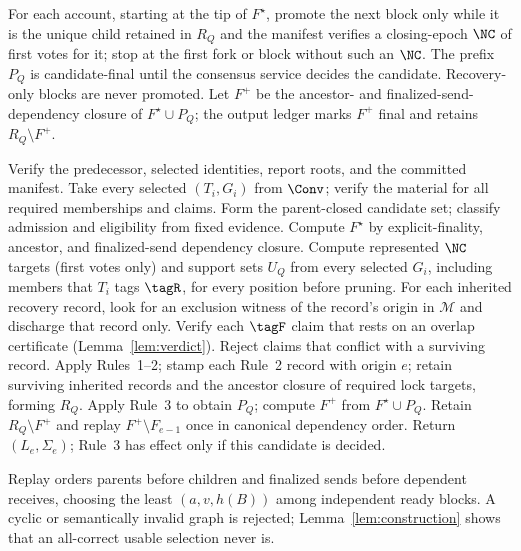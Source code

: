 For each account, starting at the tip of $F^\star$, promote the next block only while it is the unique child retained in $R_Q$ and the manifest verifies a closing-epoch $\NC$ of first votes for it; stop at the first fork or block without such an $\NC$. The prefix $P_Q$ is candidate-final until the consensus service decides the candidate. Recovery-only blocks are never promoted. Let $F^+$ be the ancestor- and finalized-send-dependency closure of $F^\star\cup P_Q$; the output ledger marks $F^+$ final and retains $R_Q\setminus F^+$.

\begin{algorithm}[t]
\caption{$\Build(S_{e-1},Q,\mathcal M)$}
\label{alg:build}
\small
\begin{algorithmic}[1]
\State Verify the predecessor, selected identities, report roots, and the committed manifest.
\State Take every selected $(T_i,G_i)$ from $\Conv$; verify the material for all required memberships and claims.
\State Form the parent-closed candidate set; classify admission and eligibility from fixed evidence.
\State Compute $F^\star$ by explicit-finality, ancestor, and finalized-send dependency closure.
\State Compute represented $\NC$ targets (first votes only) and support sets $U_Q$ from every selected $G_i$, including members that $T_i$ tags $\tagR$, for every position before pruning.
\State For each inherited recovery record, look for an exclusion witness of the record's origin in $\mathcal M$ and discharge that record only. Verify each $\tagF$ claim that rests on an overlap certificate (Lemma~\ref{lem:verdict}). Reject claims that conflict with a surviving record.
\State Apply Rules~1--2; stamp each Rule~2 record with origin $e$; retain surviving inherited records and the ancestor closure of required lock targets, forming $R_Q$.
\State Apply Rule~3 to obtain $P_Q$; compute $F^+$ from $F^\star\cup P_Q$.
\State Retain $R_Q\setminus F^+$ and replay $F^+\setminus F_{e-1}$ once in canonical dependency order.
\State Return $(L_e,\Sigma_e)$; Rule~3 has effect only if this candidate is decided.
\end{algorithmic}
\end{algorithm}

Replay orders parents before children and finalized sends before dependent receives, choosing the least $(a,v,h(B))$ among independent ready blocks. A cyclic or semantically invalid graph is rejected; Lemma~\ref{lem:construction} shows that an all-correct usable selection never is.

